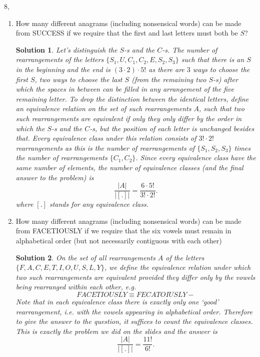 \documentclass[11pt]{preprint}
\def\enumb{\begin{enumerate}}
\def\enume{\end{enumerate}}
\newtheorem*{solution}{Solution}
\begin{document}
\item[8,]
\enumb
\item How many different anagrams (including nonsensical words) can be made from SUCCESS if we require that the first and last letters must both be $S$?
\begin{solution}
Let's distinguish the $S$-s and the $C$-s. The number of rearrangements of the letters $\{S_1,U,C_1,C_2,E,S_2,S_3\}$ such that there is an $S$ in the beginning and the end is $(3\cdot 2)\cdot 5!$ as there are $3$ ways to choose the first $S$, two ways to choose the last $S$ (from the remaining two $S$-s) after which the spaces in between can be filled in any arrangement of the five remaining letter. To drop the distinction between the identical letters, define an equivalence relation on the set of such rearrangements $A$, such that two such rearrangements are equivalent if only they only differ by the order in which the $S$-s and the $C$-s, but the position of each letter is unchanged besides that. Every equivalence class under this relation consists of $3!\cdot 2!$ rearrangements as this is the number of rearrangements of $\{S_1,S_2,S_3\}$ times the number of rearrangements $\{C_1,C_2\}$. Since every equivalence class have the same number of elements, the number of equivalence classes (and the final answer to the problem) is
\[
\frac{|A|}{|[.]|}=\frac{6\cdot 5!}{3!\cdot 2!}.
\] 
where $[.]$ stands for any equivalence class.
\end{solution}
\item How many different anagrams (including nonsensical words) can be made from FACETIOUSLY if we require that the six vowels must remain in alphabetical order (but not necessarily contiguous with each other)

\begin{solution}
On the set of all rearrangements $A$ of the letters $\{F,A,C,E,T,I,O,U,S,L,Y\}$, we define the equivalence relation under which two such rearrangements are equivalent provided they differ only by the vowels being rearranged within each other, e.g.
\[
FACETIOUSLY\equiv FECATOIUSLY-
\]
Note that in each equivalence class there is exactly only one `good' rearrangement, i.e. with the vowels appearing in alphabetical order. Therefore to give the answer to the question, it suffices to count the equivalence classes. This is exactly the problem we did on the slides and the answer is
\[
\frac{|A|}{|[.]|}=\frac{11!}{6!}.
\]
\end{solution}

\enume
\end{document}
